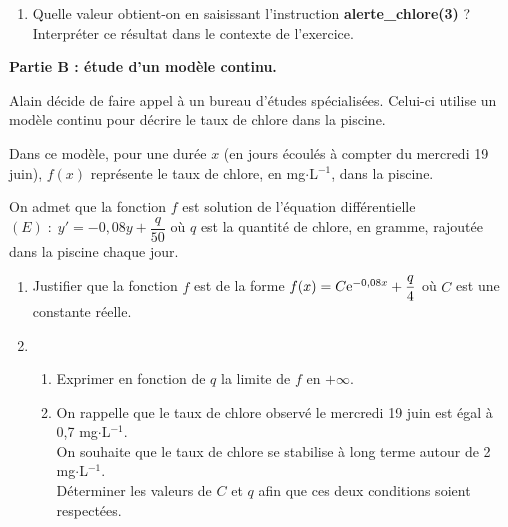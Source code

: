 \documentclass[11pt,fleqn, openany]{book} %
\begin{document}
\begin{exercise}[subtitle={(Métropole 2024)}]
\begin{enumerate}



\item Quelle valeur obtient-on en saisissant l'instruction \textbf{alerte\_chlore(3)} ? Interpréter ce résultat dans le contexte de l'exercice.
\end{enumerate}

\textbf{Partie B : étude d'un modèle continu.}

Alain décide de faire appel à un bureau d'études spécialisées. Celui-ci utilise un modèle continu pour décrire le taux de chlore dans la piscine.

Dans ce modèle, pour une durée $x$ (en jours écoulés à compter du mercredi 19 juin), $f(x)$ représente le taux de chlore, en mg$\cdot$L$^{-1}$, dans la piscine.

On admet que la fonction $f$ est solution de l'équation différentielle $(E) \;:\; y' = -0,08y+\dfrac{q}{50}$ où $q$ est la quantité de chlore, en gramme, rajoutée dans la piscine chaque jour.

\begin{enumerate}
\item Justifier que la fonction $f$ est de la forme $f(x) = C\mathrm{e}^{-0,08x}+\dfrac{q}{4}$ où $C$ est une constante réelle.
\item \begin{enumerate}
\item Exprimer en fonction de $q$ la limite de $f$ en $+\infty$.
\item On rappelle que le taux de chlore observé le mercredi 19 juin est égal à 0,7 mg$\cdot$L$^{-1}$.\\
On souhaite que le taux de chlore se stabilise à long terme autour de 2 mg$\cdot$L$^{-1}$.\\
Déterminer les valeurs de $C$ et $q$ afin que ces deux conditions soient respectées.
\end{enumerate} 

\end{enumerate}
\newpage
\end{exercise}
\end{document}
